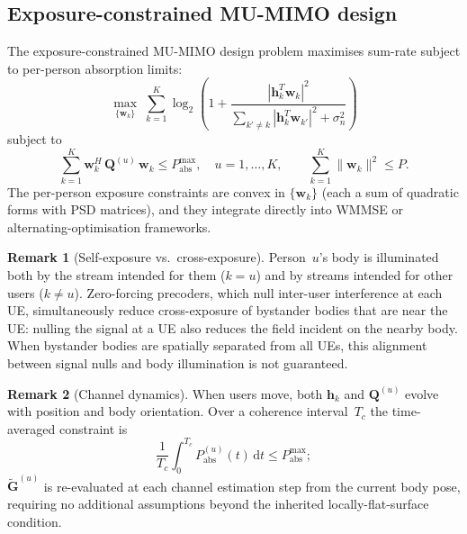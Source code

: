 \documentclass[11pt,a4paper]{article}
\theoremstyle{definition}      %
\newtheorem{remark}[remark]{Remark}
\newcommand{\diff}{\mathrm{d}}        %
\begin{document}
\subsection{Exposure-constrained MU-MIMO design}\label{sec:mu-ecbf}

The exposure-constrained MU-MIMO design problem maximises sum-rate
subject to per-person absorption limits:
\begin{equation}\label{eq:MU-QCQP}
  \max_{\{\mathbf{w}_k\}} \;\sum_{k=1}^K
  \log_2\!\left(1 + \frac{|\mathbf{h}_k^T\mathbf{w}_k|^2}
  {\sum_{k'\neq k}|\mathbf{h}_k^T\mathbf{w}_{k'}|^2 + \sigma_n^2}\right)
\end{equation}
subject to
\begin{equation}
  \sum_{k=1}^K \mathbf{w}_k^H\,\mathbf{Q}^{(u)}\,\mathbf{w}_k
  \leq P_\mathrm{abs}^\mathrm{max},\quad u = 1,\ldots,K,
  \qquad
  \sum_{k=1}^K \|\mathbf{w}_k\|^2 \leq P.
\end{equation}
The per-person exposure constraints are convex in
$\{\mathbf{w}_k\}$ (each a sum of quadratic forms with PSD
matrices), and they integrate directly into WMMSE or
alternating-optimisation frameworks.

\begin{remark}[Self-exposure vs.\ cross-exposure]
Person~$u$'s body is illuminated both by the stream intended for
them ($k = u$) and by streams intended for other users
($k \neq u$).  Zero-forcing precoders, which null inter-user
interference at each UE, simultaneously reduce cross-exposure of
bystander bodies that are near the UE: nulling the signal at a UE
also reduces the field incident on the nearby body.  When bystander
bodies are spatially separated from all UEs, this alignment between
signal nulls and body illumination is not guaranteed.
\end{remark}

\begin{remark}[Channel dynamics]
When users move, both $\mathbf{h}_k$ and $\mathbf{Q}^{(u)}$ evolve
with position and body orientation.  Over a coherence interval~$T_c$
the time-averaged constraint is
\begin{equation}
  \frac{1}{T_c}\int_0^{T_c}
  P_\mathrm{abs}^{(u)}(t)\,\diff t \leq P_\mathrm{abs}^\mathrm{max};
\end{equation}
$\tilde{\mathbf{G}}^{(u)}$ is re-evaluated at each channel
estimation step from the current body pose, requiring no additional
assumptions beyond the inherited locally-flat-surface condition.
\end{remark}
\end{document}
